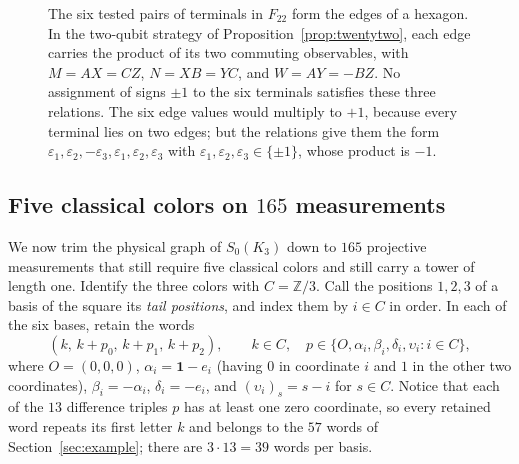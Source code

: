 \begin{figure}[htbp]
\centering
{}
\caption{The six tested pairs of terminals in $F_{22}$ form the edges of a hexagon. In the two-qubit strategy of Proposition~\ref{prop:twentytwo}, each edge carries the product of its two commuting observables, with $M=AX=CZ$, $N=XB=YC$, and $W=AY=-BZ$. No assignment of signs $\pm1$ to the six terminals satisfies these three relations. The six edge values would multiply to $+1$, because every terminal lies on two edges; but the relations give them the form $\varepsilon_1,\varepsilon_2,-\varepsilon_3,\varepsilon_1,\varepsilon_2,\varepsilon_3$ with $\varepsilon_1,\varepsilon_2,\varepsilon_3\in\{\pm1\}$, whose product is $-1$.}
\label{fig:hexagon}
\end{figure}

\subsection{Five classical colors on \texorpdfstring{$165$}{165} measurements}\label{sec:165}

We now trim the physical graph of $S_0(K_3)$ down to $165$ projective measurements that still require five classical colors and still carry a tower of length one. Identify the three colors with $C=\mathbb Z/3$. Call the positions $1,2,3$ of a basis of the square its \emph{tail positions}, and index them by $i\in C$ in order. In each of the six bases, retain the words
\begin{equation}\label{eq:finite-words}
 (k,\,k+p_0,\,k+p_1,\,k+p_2),\qquad
 k\in C,\quad
 p\in\{O,\alpha_i,\beta_i,\delta_i,\upsilon_i:i\in C\},
\end{equation}
where $O=(0,0,0)$, $\alpha_i=\mathbf 1-e_i$ (having $0$ in coordinate $i$ and $1$ in the other two coordinates), $\beta_i=-\alpha_i$, $\delta_i=-e_i$, and $(\upsilon_i)_s=s-i$ for $s\in C$. Notice that each of the $13$ difference triples $p$ has at least one zero coordinate, so every retained word repeats its first letter $k$ and belongs to the $57$ words of Section~\ref{sec:example}; there are $3\cdot13=39$ words per basis.


